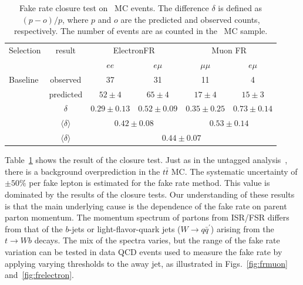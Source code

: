 
\begin{table}[h]
\begin{center}
\begin{tabular}{lc|cc|cc}
\hline\hline
Selection	& result	&	\multicolumn{2}{|c}{ElectronFR}		& \multicolumn{2}{|c}{Muon FR}	\\
		&				&	$ee$		& $e\mu$		& $\mu\mu$	& $e\mu$	\\\hline
Baseline	&	observed		& 37			& 31			& 11		& 4		\\
		&predicted			& $52\pm4$		& $65\pm4$		& $17\pm 4$	& $15\pm3$	\\ 
		& $\delta$			& $0.29\pm 0.13$	& $0.52\pm0.09$		& $0.35\pm0.25$	& $0.73\pm0.14$	\\ 
		& $\langle \delta \rangle$	& \multicolumn{2}{|c}{$0.42\pm0.08$}		& \multicolumn{2}{|c}{$0.53\pm0.14$} \\
		& $\langle \delta \rangle$	& 		\multicolumn{4}{|c}{$0.44\pm 0.07$}				\\ \hline
\hline
\end{tabular}
\caption{\label{tab:ttclosure}Fake rate closure test on \ttbar\ MC events.
The difference $\delta$ is defined as $(p-o)/p$, where $p$ and $o$ are the predicted
and observed counts, respectively.
The number of events are as counted in the \ttbar\ MC sample.}
\end{center}
\end{table}

\newcommand{\nNoNu}{\ensuremath{N_{{n}\overline{n}}}}
\newcommand{\nNoNo}{\ensuremath{N_{\overline{n}\overline{n}}}}
\newcommand{\nNuNu}{\ensuremath{N_{{n}{n}}}}

Table~\ref{tab:ttclosure} shows the result of the closure test.  Just as 
in the untagged analysis~\cite{ssnote2011}, there is a background
overprediction in the $t\bar{t}$ MC.
The systematic uncertainty of $\pm 50\%$ per fake lepton is estimated for the fake rate method.
This value is dominated by the results of the closure tests.
Our understanding of these results is that the main underlying cause is 
the dependence of the fake rate on parent parton momentum.
The momentum spectrum of partons from ISR/FSR differs from that of the $b$-jets
or light-flavor-quark jets ($W\to q\bar{q}^\prime$) arising from the $t\to W b$ decays.
The mix of the spectra varies, but the range of the fake rate variation
can be tested in data QCD events used to measure the fake rate
by applying varying thresholds to the away jet, as illustrated in Figs.~\ref{fig:frmuon} and~\ref{fig:frelectron}.

